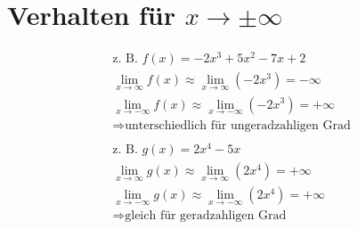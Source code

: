 \section{Verhalten für $x \to \pm \infty$}
\begin{gather*}
  \text{z. B. } f(x) = -2x^3 + 5x^2 - 7x + 2 \\
  \lim\limits_{x \to \infty} f(x) \approx \lim\limits_{x \to \infty} (-2x^3) = -\infty \\
  \lim\limits_{x \to -\infty} f(x) \approx \lim\limits_{x \to -\infty} (-2x^3) = +\infty \\
  \Rightarrow \text{unterschiedlich für ungeradzahligen Grad} \\\\
  \text{z. B. } g(x) = 2x^4 - 5x \\
  \lim\limits_{x \to \infty} g(x) \approx \lim\limits_{x \to \infty} (2x^4) = +\infty \\
  \lim\limits_{x \to -\infty} g(x) \approx \lim\limits_{x \to -\infty} (2x^4) = +\infty \\
  \Rightarrow \text{gleich für geradzahligen Grad} \\\\
\end{gather*}
